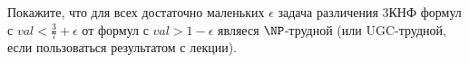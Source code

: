 \begin{task}
	Покажите, что для всех достаточно маленьких $\epsilon$ задача различения 3КНФ формул с $val < \frac{3}{7} + \epsilon$ от
    формул с $val > 1 - \epsilon$ являеся $\NP$-трудной (или UGC-трудной, если пользоваться результатом с лекции).
\end{task}


